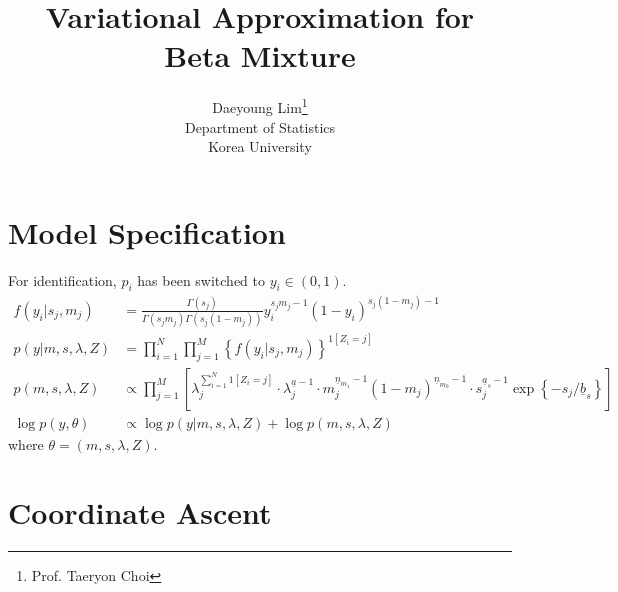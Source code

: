 \documentclass[11pt]{article}
\begin{document}
\nocite{*}

\title{Variational Approximation for Beta Mixture}

\author{Daeyoung Lim\thanks{Prof. Taeryon Choi} \\
Department of Statistics \\
Korea University}

\maketitle

\section{Model Specification}
For identification, $p_{i}$ has been switched to $y_{i} \in \left(0,1\right)$.
\begin{align*}
  f\left(y_{i}|s_{j}, m_{j}\right) &= \frac{\Gamma\left(s_{j}\right)}{\Gamma\left(s_{j}m_{j}\right)\Gamma\left(s_{j}\left(1-m_{j}\right)\right)} y_{i}^{s_{j}m_{j}-1} \left(1-y_{i}\right)^{s_{j}\left(1-m_{j}\right)-1}\\
  p\left(y|m,s,\lambda,Z\right) &= \prod_{i=1}^{N}\prod_{j=1}^{M}\left\{f\left(y_{i}|s_{j}, m_{j}\right) \right\}^{1\left[Z_{i}=j \right]} \\
  p\left(m, s, \lambda, Z\right) &\propto \prod_{j=1}^{M} \left[\lambda_{j}^{\sum_{i=1}^{N}1\left[Z_{i}=j\right]} \cdot \lambda_{j}^{\underline{a}-1} \cdot m_{j}^{\underline{n}_{m_{1}}-1} \left(1-m_{j}\right)^{\underline{n}_{m_{0}}-1} \cdot s_{j}^{\underline{a}_{s}-1}\exp \left\{-s_{j}/\underline{b}_{s} \right\} \right]\\
  \log p\left(y, \theta\right) &\propto \log p \left(y|m,s, \lambda, Z\right) + \log p\left(m, s, \lambda, Z\right)
\end{align*}
where $\theta = \left(m, s, \lambda, Z\right)$.
\section{Coordinate Ascent}
\end{document}
